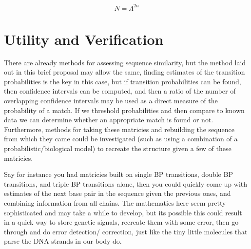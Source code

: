 \documentclass{article}
\begin{document}
$$ 
N = \Lambda^{2n}
$$

\section{Utility and Verification} 

There are already methods for assessing sequence similarity, but 
the method laid out in this brief proposal may allow the same, 
finding estimates of the transition probabilities is the key 
in this case, but if transition probabilities can be found, then
confidence intervals can be computed, and then a ratio of the 
number of overlapping confidence intervals may be used as a 
direct measure of the probability of a match.  If we threshold 
probabilities and then compare to known data we can determine 
whether an appropriate match is found or not.  Furthermore, 
methods for taking these matricies and rebuilding the sequence
from which they came could be investigated (such as using a 
combination of a probabilistic/biological model) to recreate
the structure given a few of these matricies. 

Say for instance you had matricies built on single BP transitions, 
double BP transitions, and triple BP transitions alone, then you 
could quickly come up with estimates of the next base pair in 
the sequence given the previous ones, and combining information 
from all chains.  The mathematics here seem pretty sophisticated 
and may take a while to develop, but its possible this could 
result in a quick way to store genetic signals, recreate them with
some error, then go through and do error detection/ correction,
just like the tiny little molecules that parse the DNA strands in
our body do.

 
 
\end{document}
